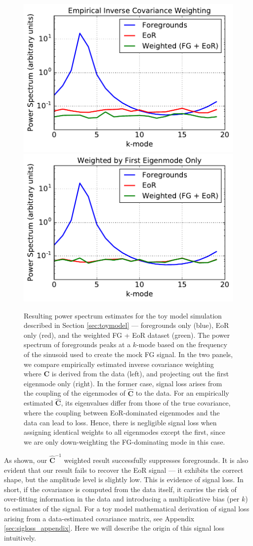 \documentclass[preprint2,numberedappendix,tighten]{aastex6}
\begin{document}
\begin{figure}
	\centering
	\includegraphics[trim={0cm 0cm 0cm 0cm},clip,height=0.33\textwidth]{plots/toy_sigloss3.pdf}
	\includegraphics[trim={0cm 0cm 0cm 0cm},clip,height=0.33\textwidth]{plots/toy_sigloss4.pdf}
	\caption{Resulting power spectrum estimates for the toy model simulation described in Section \ref{sec:toymodel} --- 
foregrounds only (blue), EoR only (red), and the weighted FG + EoR dataset (green). The power spectrum of foregrounds peaks at a $k$-mode based on the frequency of the sinusoid used to create the mock FG signal. In the two panels, we compare empirically estimated inverse covariance weighting 
where $\textbf{C}$ is derived from the data (left), and projecting out the first eigenmode only (right). In the former 
case, signal loss arises from the coupling of the eigenmodes of $\widehat{\textbf{C}}$ to the data. For an empirically estimated $\widehat{\textbf{C}}$, its eigenvalues differ from those of the true covariance, where the coupling between EoR-dominated eigenmodes and the data can lead to loss.
Hence, there is negligible signal loss when assigning identical weights to all eigenmodes except the first, since we are only down-weighting the FG-dominating mode in this case.}
	\label{fig:toy_sigloss3}
\end{figure}

As shown, our $\widehat{\textbf{C}}^{-1}$ weighted result successfully suppresses foregrounds. It is also evident that our result fails to 
recover the EoR signal --- it exhibits the correct shape, but the amplitude level is slightly low. This is evidence of signal loss. In short, if the covariance is computed from the data itself, it carries the risk of over-fitting information in the data and introducing a 
multiplicative bias (per $k$) to estimates of the signal. For a toy model mathematical derivation of signal loss arising from a data-estimated covariance matrix, see Appendix \ref{sec:sigloss_appendix}. Here we will describe the origin of this signal loss 
intuitively.
\end{document}
